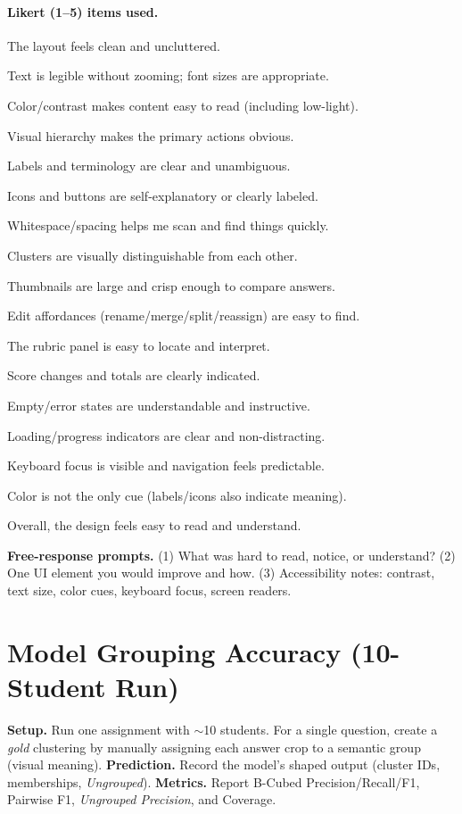 \documentclass[ms,twoside,print]{nuthesis}
\begin{document}
\paragraph{Likert (1–5) items used.}
\begin{compactenum}
  \item The layout feels clean and uncluttered.
  \item Text is legible without zooming; font sizes are appropriate.
  \item Color/contrast makes content easy to read (including low-light).
  \item Visual hierarchy makes the primary actions obvious.
  \item Labels and terminology are clear and unambiguous.
  \item Icons and buttons are self-explanatory or clearly labeled.
  \item Whitespace/spacing helps me scan and find things quickly.
  \item Clusters are visually distinguishable from each other.
  \item Thumbnails are large and crisp enough to compare answers.
  \item Edit affordances (rename/merge/split/reassign) are easy to find.
  \item The rubric panel is easy to locate and interpret.
  \item Score changes and totals are clearly indicated.
  \item Empty/error states are understandable and instructive.
  \item Loading/progress indicators are clear and non-distracting.
  \item Keyboard focus is visible and navigation feels predictable.
  \item Color is not the only cue (labels/icons also indicate meaning).
  \item Overall, the design feels easy to read and understand.
\end{compactenum}
\textbf{Free-response prompts.}  
(1) What was hard to read, notice, or understand?  
(2) One UI element you would improve and how.  
(3) Accessibility notes: contrast, text size, color cues, keyboard focus, screen readers.

\section{Model Grouping Accuracy (10-Student Run)}
\textbf{Setup.} Run one assignment with $\sim$10 students. For a single question, create a \emph{gold} clustering by manually assigning each answer crop to a semantic group (visual meaning).  
\textbf{Prediction.} Record the model’s shaped output (cluster IDs, memberships, \emph{Ungrouped}).  
\textbf{Metrics.} Report B-Cubed Precision/Recall/F1, Pairwise F1, \emph{Ungrouped Precision}, and Coverage.
\end{document}
